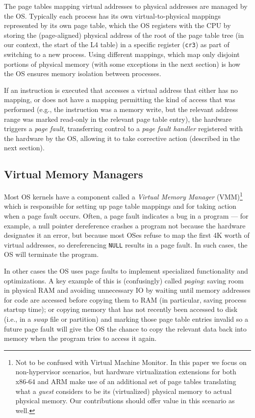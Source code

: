 The page tables mapping virtual addresses to physical addresses are managed by the OS. Typically each process has its own 
virtual-to-physical mappings represented by its own page table, which the OS registers with the CPU by storing the (page-aligned)
physical address of the root of the page table tree (in our context, the start of the L4 table) in a 
specific register (\texttt{cr3}) as part of switching to a new process. 
Using different mappings, which map only disjoint portions of physical memory (with some exceptions in the next section) 
is how the OS ensures memory isolation between processes.

If an instruction is executed that accesses a virtual address that either has no mapping, or does not have a mapping permitting the kind of access that was performed (e.g., the instruction was a memory write, but the relevant address range was marked read-only in the relevant page table entry), the hardware triggers a \emph{page fault}, transferring control to a \emph{page fault handler} registered with the hardware by the OS, allowing it to take corrective action (described in the next section).

\subsection{Virtual Memory Managers}
\label{sec:backgroundonvmm}
Most OS kernels have a component called a \emph{Virtual Memory Manager} (VMM)\footnote{Not to be confused with Virtual 
Machine Monitor. In this paper we focus on non-hypervisor scenarios, but hardware virtualization extensions for both 
x86-64 and ARM make use of an additional set of page tables translating what a \emph{guest} considers to be its 
(virtualized) physical memory to actual physical memory. Our contributions should offer value in this scenario as well.}
which is responsible for setting up page table mappings and for taking action when a page fault occurs. Often, a page 
fault indicates a bug in a program --- for example, a null pointer dereference crashes a program not because the hardware
 designates it an error, but because most OSes refuse to map the first 4K worth of virtual addresses, so dereferencing 
\texttt{NULL} results in a page fault. In such cases, the OS will terminate the program.

In other cases the OS uses page faults to implement specialized functionality and optimizations. A key example of this is 
(confusingly) called \emph{paging}: saving room in physical RAM and avoiding unnecessary IO 
by waiting until memory addresses for code are accessed 
before copying them to RAM (in particular, saving process startup time); 
or copying memory that has not recently been accessed to disk 
(i.e., in a \emph{swap} file or partition) and marking those page table entries invalid so a future page fault will give 
the OS the chance to copy the relevant data back into memory when the program tries to access it again.

